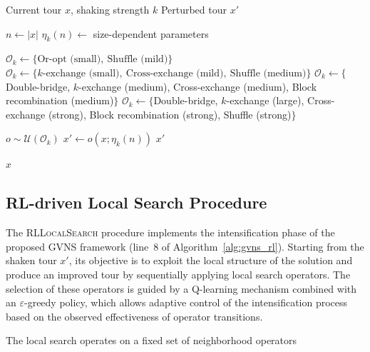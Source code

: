 \documentclass[runningheads]{llncs}
\begin{document}
\begin{algorithm}[ht]
\caption{Adaptive Shaking Procedure}
\label{alg:adaptive_shaking}
\footnotesize
\begin{algorithmic}[1]
\Require Current tour $x$, shaking strength $k$
\Ensure Perturbed tour $x'$

\State $n \gets |x|$ 
\State $\eta_k(n) \gets$ size-dependent parameters 

    \State $\mathcal{O}_k \gets \{\text{Or-opt (small)},\ \text{Shuffle (mild)}\}$
    \State $\mathcal{O}_k \gets \{\text{$k$-exchange (small)},\ \text{Cross-exchange (mild)},\ \text{Shuffle (medium)}\}$
    \State $\mathcal{O}_k \gets \{$Double-bridge, $k$-exchange (medium), Cross-exchange (medium),
    \Statex \hspace{1.6em} Block recombination (medium)$\}$
\Else
    \State $\mathcal{O}_k \gets \{$Double-bridge, $k$-exchange (large), Cross-exchange (strong),
    \Statex \hspace{1.6em} Block recombination (strong), Shuffle (strong)$\}$
\EndIf

    \State $o \sim \mathcal{U}(\mathcal{O}_k)$
    \State $x' \gets o(x;\eta_k(n))$
        \State \Return $x'$
    \EndIf
\EndFor

\State \Return $x$
\end{algorithmic}
\end{algorithm}




\subsection{RL-driven Local Search Procedure}
\label{subsec:rl_local_search}

The \textsc{RLLocalSearch} procedure implements the intensification phase of the proposed GVNS framework (line~8 of Algorithm~\ref{alg:gvns_rl}). Starting from the shaken tour \(x'\), its objective is to exploit the local structure of the solution and produce an improved tour by sequentially applying local search operators. The selection of these operators is guided by a Q-learning mechanism combined with an \(\varepsilon\)-greedy policy, which allows adaptive control of the intensification process based on the observed effectiveness of operator transitions.

The local search operates on a fixed set of neighborhood operators
\end{document}

